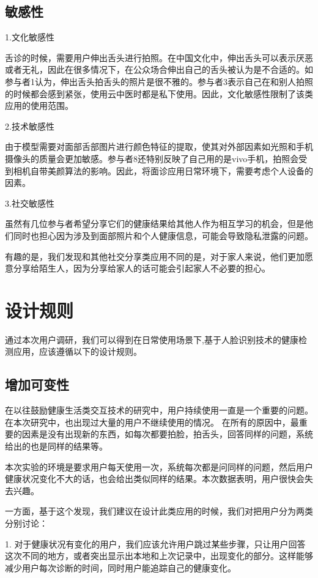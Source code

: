\subsection{敏感性}
1.文化敏感性

舌诊的时候，需要用户伸出舌头进行拍照。在中国文化中，伸出舌头可以表示厌恶或者无礼，因此在很多情况下，在公众场合伸出自己的舌头被认为是不合适的。如参与者1认为，伸出舌头拍舌头的照片是很不雅的。参与者3表示自己在和别人拍照的时候都会感到紧张，使用云中医时都是私下使用。因此，文化敏感性限制了该类应用的使用范围。

2.技术敏感性

由于模型需要对面部舌部图片进行颜色特征的提取，使其对外部因素如光照和手机摄像头的质量会更加敏感。参与者8还特别反映了自己用的是vivo手机，拍照会受到相机自带美颜算法的影响。因此，将面诊应用日常环境下，需要考虑个人设备的因素。

3.社交敏感性

虽然有几位参与者希望分享它们的健康结果给其他人作为相互学习的机会，但是他们同时也担心因为涉及到面部照片和个人健康信息，可能会导致隐私泄露的问题。


有趣的是，我们发现和其他社交分享类应用不同的是，对于家人来说，他们更加愿意分享给陌生人，因为分享给家人的话可能会引起家人不必要的担心。


\section{设计规则}

通过本次用户调研，我们可以得到在日常使用场景下,基于人脸识别技术的健康检测应用，应该遵循以下的设计规则。

\subsection{增加可变性}
在以往鼓励健康生活类交互技术的研究中，用户持续使用一直是一个重要的问题。在本次研究中，也出现过大量的用户不继续使用的情况。
在所有的原因中，最重要的因素是没有出现新的东西，如每次都要拍脸，拍舌头，回答同样的问题，系统给出的也是同样的结果等。

本次实验的环境是要求用户每天使用一次，系统每次都是问同样的问题，然后用户健康状况变化不大的话，也会给出类似同样的结果。本次数据表明，用户很快会失去兴趣。

一方面，基于这个发现，我们建议在设计此类应用的时候，我们对把用户分为两类分别讨论：

1. 对于健康状况有变化的用户，我们应该允许用户跳过某些步骤，只让用户回答这次不同的地方，或者突出显示出本地和上次记录中，出现变化的部分。这样能够减少用户每次诊断的时间，同时用户能追踪自己的健康变化。

